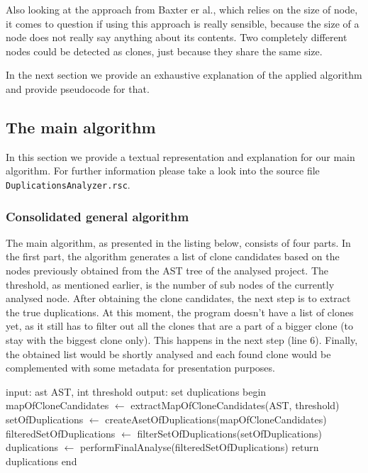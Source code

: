 \documentclass{uva-inf-article}
\begin{document}
Also looking at the approach from Baxter er al., which relies on the size of node, it comes to question if using this approach is really sensible, because the size of a node does not really say anything about its contents. Two completely different nodes could be detected as clones, just because they share the same size.

In the next section we provide an exhaustive explanation of the applied algorithm and provide pseudocode for that. 

\subsection{The main algorithm}\label{main_alg}

In this section we provide a textual representation and explanation for our main algorithm. For further information please take a look into the source file \texttt{DuplicationsAnalyzer.rsc}.

\subsubsection{Consolidated general algorithm}

The main algorithm, as presented in the listing below, consists of four parts. In the first part, the algorithm generates a list of clone candidates based on the nodes previously obtained from the AST tree of the analysed project. The threshold, as mentioned earlier, is the number of sub nodes of the currently analysed node. After obtaining the clone candidates, the next step is to extract the true duplications. At this moment, the program doesn't have a list of clones yet, as it still has to filter out all the clones that are a part of a bigger clone (to stay with the biggest clone only). This happens in the next step (line 6). Finally, the obtained list would be shortly analysed and each found clone would be complemented with some metadata for presentation purposes. 

\begin{pseudocode}[caption={Consolidated general algorithm.}, label={alg0}]
 input: ast AST, int threshold
 output: set duplications
 begin
  mapOfCloneCandidates $\gets$ extractMapOfCloneCandidates(AST, threshold)
  setOfDuplications $\gets$ createAsetOfDuplications(mapOfCloneCandidates)
  filteredSetOfDuplications $\gets$ filterSetOfDuplications(setOfDuplications)
  duplications $\gets$ performFinalAnalyse(filteredSetOfDuplications)
  return duplications
 end       
\end{pseudocode}
\end{document}
